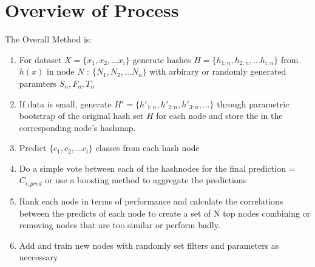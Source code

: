 \section{Overview of Process}

The Overall Method is: 

\begin{enumerate}
\item{For dataset $X = \{x_1, x_2, ... x_i\}$ generate hashes $H = \{h_{1:n}, h_{2:n}, ... h_{i:n}\}$ from $h(x)$ in node $N$ : $\{N_1, N_2, ... N_n\}$ with arbirary or randomly generated paramters $ S_n, F_n, T_n $}
\item{If data is small, generate $H' = \{h'_{1:n}, h'_{2:n}, h'_{3:n}, ...\}$ through parametric bootstrap of the original hash set $H$ for each node and store the in the corresponding node's hashmap.}
\item{Predict $\{c_1,c_2, ... c_i \}$ classes from each hash node}
\item{Do a simple vote between each of the hashnodes for the final prediction = $C_{i; pred}$ or use a boosting method to aggregate the predictions}
\item{Rank each node in terms of performance and calculate the correlations between the predicts of each node to create a set of N top nodes combining or removing nodes that are too similar or perform badly.}
\item{Add and train new nodes with randomly set filters and parameters as neccessary}
\end{enumerate}


